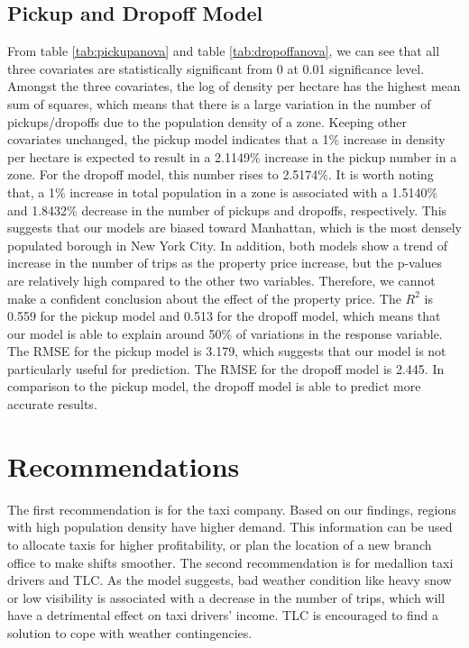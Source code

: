 \documentclass[11pt]{article}
\begin{document}
\subsection{Pickup and Dropoff Model}
From table \ref{tab:pickupanova} and table \ref{tab:dropoffanova}, we can see that all three covariates are statistically significant from 0 at 0.01 significance level. Amongst the three covariates, the log of density per hectare has the highest mean sum of squares, which means that there is a large variation in the number of pickups/dropoffs due to the population density of a zone. Keeping other covariates unchanged, the pickup model indicates that a 1\% increase in density per hectare is expected to result in a 2.1149\% increase in the pickup number in a zone. For the dropoff model, this number rises to 2.5174\%. It is worth noting that, a 1\% increase in total population in a zone is associated with a 1.5140\% and 1.8432\% decrease in the number of pickups and dropoffs, respectively. This suggests that our models are biased toward Manhattan, which is the most densely populated borough in New York City. In addition, both models show a trend of increase in the number of trips as the property price increase, but the p-values are relatively high compared to the other two variables. Therefore, we cannot make a confident conclusion about the effect of the property price. The $R^2$ is 0.559 for the pickup model and 0.513 for the dropoff model, which means that our model is able to explain around 50\% of variations in the response variable. The RMSE for the pickup model is 3.179, which suggests that our model is not particularly useful for prediction. The RMSE for the dropoff model is 2.445. In comparison to the pickup model, the dropoff model is able to predict more accurate results.

\section{Recommendations}
The first recommendation is for the taxi company. Based on our findings, regions with high population density have higher demand. This information can be used to allocate taxis for higher profitability, or plan the location of a new branch office to make shifts smoother. The second recommendation is for medallion taxi drivers and TLC. As the model suggests, bad weather condition like heavy snow or low visibility is associated with a decrease in the number of trips, which will have a detrimental effect on taxi drivers' income. TLC is encouraged to find a solution to cope with weather contingencies. 
\end{document}
